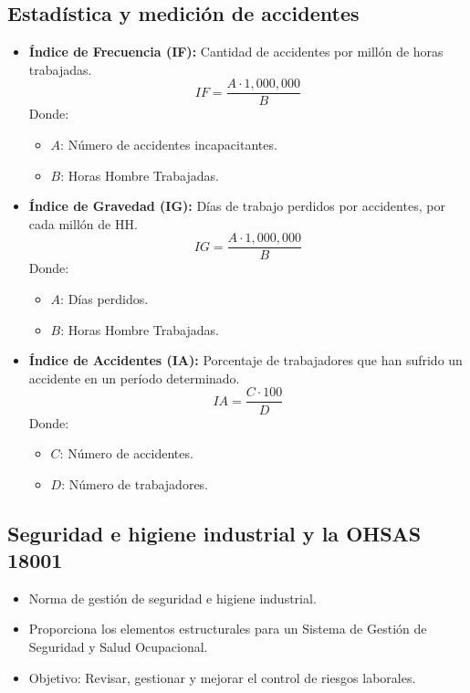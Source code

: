 \documentclass{article} %
\begin{document}
\subsection{Estadística y medición de accidentes}
\begin{itemize}
    \item \textbf{Índice de Frecuencia (IF):} Cantidad de accidentes por millón de horas trabajadas.
    \[
    IF = \frac{A \cdot 1,000,000}{B}
    \]
    Donde:
    \begin{itemize}
        \item $A$: Número de accidentes incapacitantes.
        \item $B$: Horas Hombre Trabajadas.
    \end{itemize}
    
    \item \textbf{Índice de Gravedad (IG):} Días de trabajo perdidos por accidentes, por cada millón de HH.
    \[
    IG = \frac{A \cdot 1,000,000}{B}
    \]
    Donde:
    \begin{itemize}
        \item $A$: Días perdidos.
        \item $B$: Horas Hombre Trabajadas.
    \end{itemize}
    
    \item \textbf{Índice de Accidentes (IA):} Porcentaje de trabajadores que han sufrido un accidente en un período determinado.
    \[
    IA = \frac{C \cdot 100}{D}
    \]
    Donde:
    \begin{itemize}
        \item $C$: Número de accidentes.
        \item $D$: Número de trabajadores.
    \end{itemize}
\end{itemize}

\subsection{Seguridad e higiene industrial y la OHSAS 18001}
\begin{itemize}
    \item Norma de gestión de seguridad e higiene industrial.
    \item Proporciona los elementos estructurales para un Sistema de Gestión de Seguridad y Salud Ocupacional.
    \item Objetivo: Revisar, gestionar y mejorar el control de riesgos laborales.
\end{itemize}
\end{document}
